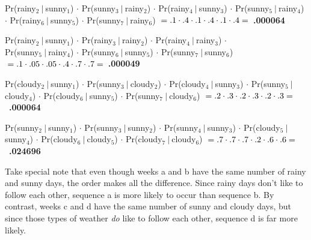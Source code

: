 \begin{alttitles}
\begin{compactenum}[a.]
\small
\item
Pr(rainy$_2\ |\ $sunny$_1$) $\cdot$
Pr(sunny$_3\ |\ $rainy$_2$) $\cdot$
Pr(rainy$_4\ |\ $sunny$_3$) $\cdot$
Pr(sunny$_5\ |\ $rainy$_4$) $\cdot$
Pr(rainy$_6\ |\ $sunny$_5$) $\cdot$
Pr(sunny$_7\ |\ $rainy$_6$) $\\=
.1 \cdot .4 \cdot .1 \cdot .4 \cdot .1 \cdot .4 = $\ \textbf{.000064} \\
\item
Pr(rainy$_2\ |\ $sunny$_1$) $\cdot$
Pr(rainy$_3\ |\ $rainy$_2$) $\cdot$
Pr(rainy$_4\ |\ $rainy$_3$) $\cdot$\\
Pr(sunny$_5\ |\ $rainy$_4$) $\cdot$
Pr(sunny$_6\ |\ $sunny$_5$) $\cdot$
Pr(sunny$_7\ |\ $sunny$_6$) $\\=
.1 \cdot .05 \cdot .05 \cdot .4 \cdot .7 \cdot .7 = $\ \textbf{.000049} \\
\item
Pr(cloudy$_2\ |\ $sunny$_1$) $\cdot$
Pr(sunny$_3\ |\ $cloudy$_2$) $\cdot$
Pr(cloudy$_4\ |\ $sunny$_3$) $\cdot$
Pr(sunny$_5\ |\ $cloudy$_4$) $\cdot$
Pr(cloudy$_6\ |\ $sunny$_5$) $\cdot$
Pr(sunny$_7\ |\ $cloudy$_6$) $\\=
.2 \cdot .3 \cdot .2 \cdot .3 \cdot .2 \cdot .3 = $\ \textbf{.000064} \\
\item
Pr(sunny$_2\ |\ $sunny$_1$) $\cdot$
Pr(sunny$_3\ |\ $sunny$_2$) $\cdot$
Pr(sunny$_4\ |\ $sunny$_3$) $\cdot$
Pr(cloudy$_5\ |\ $sunny$_4$) $\cdot$
Pr(cloudy$_6\ |\ $cloudy$_5$) $\cdot$
Pr(cloudy$_7\ |\ $cloudy$_6$) $\\=
.7 \cdot .7 \cdot .7 \cdot .2 \cdot .6 \cdot .6 = $\ \textbf{.024696} \\

\end{compactenum}

Take special note that even though weeks a and b have the same number of rainy
and sunny days, the order makes all the difference. Since rainy days don't like
to follow each other, sequence a is more likely to occur than sequence b. By
contrast, weeks c and d have the same number of sunny and cloudy days, but
since those types of weather \textit{do} like to follow each other, sequence d
is far more likely.

\label{markovPuzzleSol}


\end{alttitles}
